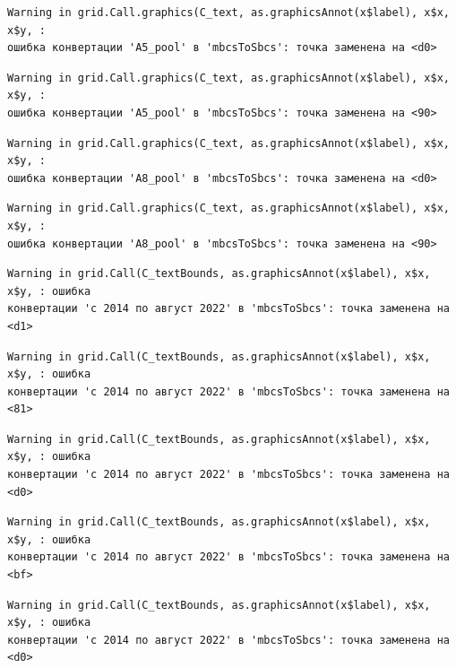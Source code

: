 \documentclass[
  letterpaper,
  DIV=11,
  numbers=noendperiod]{scrreprt}
\begin{document}
\begin{verbatim}
Warning in grid.Call.graphics(C_text, as.graphicsAnnot(x$label), x$x, x$y, :
ошибка конвертации 'А5_pool' в 'mbcsToSbcs': точка заменена на <d0>
\end{verbatim}

\begin{verbatim}
Warning in grid.Call.graphics(C_text, as.graphicsAnnot(x$label), x$x, x$y, :
ошибка конвертации 'А5_pool' в 'mbcsToSbcs': точка заменена на <90>
\end{verbatim}

\begin{verbatim}
Warning in grid.Call.graphics(C_text, as.graphicsAnnot(x$label), x$x, x$y, :
ошибка конвертации 'А8_pool' в 'mbcsToSbcs': точка заменена на <d0>
\end{verbatim}

\begin{verbatim}
Warning in grid.Call.graphics(C_text, as.graphicsAnnot(x$label), x$x, x$y, :
ошибка конвертации 'А8_pool' в 'mbcsToSbcs': точка заменена на <90>
\end{verbatim}

\begin{verbatim}
Warning in grid.Call(C_textBounds, as.graphicsAnnot(x$label), x$x, x$y, : ошибка
конвертации 'с 2014 по август 2022' в 'mbcsToSbcs': точка заменена на <d1>
\end{verbatim}

\begin{verbatim}
Warning in grid.Call(C_textBounds, as.graphicsAnnot(x$label), x$x, x$y, : ошибка
конвертации 'с 2014 по август 2022' в 'mbcsToSbcs': точка заменена на <81>
\end{verbatim}

\begin{verbatim}
Warning in grid.Call(C_textBounds, as.graphicsAnnot(x$label), x$x, x$y, : ошибка
конвертации 'с 2014 по август 2022' в 'mbcsToSbcs': точка заменена на <d0>
\end{verbatim}

\begin{verbatim}
Warning in grid.Call(C_textBounds, as.graphicsAnnot(x$label), x$x, x$y, : ошибка
конвертации 'с 2014 по август 2022' в 'mbcsToSbcs': точка заменена на <bf>
\end{verbatim}

\begin{verbatim}
Warning in grid.Call(C_textBounds, as.graphicsAnnot(x$label), x$x, x$y, : ошибка
конвертации 'с 2014 по август 2022' в 'mbcsToSbcs': точка заменена на <d0>
\end{verbatim}
\end{document}
